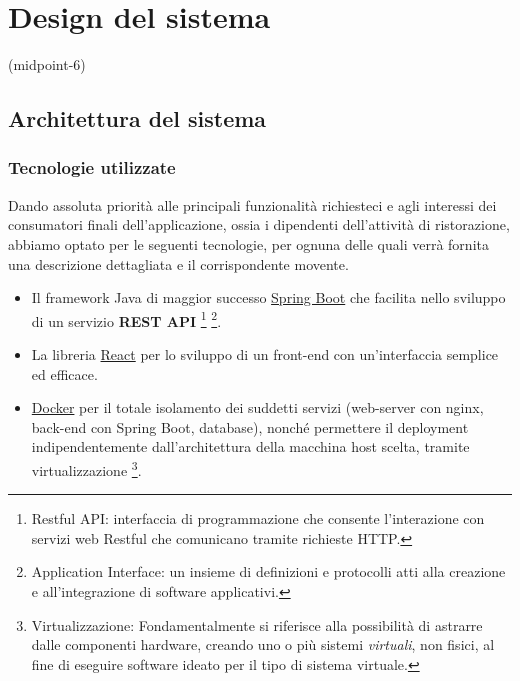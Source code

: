 \chapter[Documento di]{Design del sistema}(midpoint-6)

\section{Architettura del sistema}
	\subsection{Tecnologie utilizzate}
	Dando assoluta priorità alle principali funzionalità richiesteci e agli interessi dei consumatori finali dell'applicazione, ossia i dipendenti dell'attività
	di ristorazione, abbiamo optato per le seguenti tecnologie, per ognuna delle quali verrà fornita una descrizione dettagliata e il corrispondente movente.

	\begin{itemize}
		\item Il framework Java di maggior successo \href{https://spring.io/}{Spring Boot} che facilita nello sviluppo di un servizio \textbf{REST API}%
		\footnote{Restful API: interfaccia di programmazione che consente l'interazione con servizi web Restful che comunicano tramite richieste HTTP.}%
		\footnote{Application Interface: un insieme di definizioni e protocolli atti alla creazione e all'integrazione di software applicativi.}.%
		\item La libreria \href{https://reactjs.org/}{React} per lo sviluppo di un front-end con un'interfaccia semplice ed efficace.
		\item \href{https://www.docker.com/}{Docker} per il totale isolamento dei suddetti servizi (web-server con nginx, back-end con Spring Boot, database),
		nonché permettere il deployment indipendentemente dall'architettura della macchina host scelta, tramite virtualizzazione%
		\footnote{Virtualizzazione: Fondamentalmente si riferisce alla possibilità di astrarre dalle componenti hardware, creando uno o più sistemi \textit{virtuali}, non fisici, al fine di eseguire software
		ideato per il tipo di sistema virtuale.}.
	\end{itemize}

